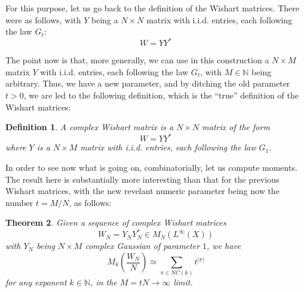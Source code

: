 \documentclass[12pt]{amsbook}
\newtheorem{theorem}{Theorem}[chapter]
\newtheorem{definition}[theorem]{Definition}
\begin{document}
\bigskip

For this purpose, let us go back to the definition of the Wishart matrices. There were as follows, with $Y$ being a $N\times N$ matrix with i.i.d. entries, each following the law $G_t$:
$$W=YY^*$$

The point now is that, more generally, we can use in this construction a $N\times M$ matrix $Y$ with i.i.d. entries, each following the law $G_t$, with $M\in\mathbb N$ being arbitrary. Thus, we have a new parameter, and by ditching the old parameter $t>0$, we are led to the following definition, which is the ``true'' definition of the Wishart matrices:

\begin{definition}
A complex Wishart matrix is a $N\times N$ matrix of the form
$$W=YY^*$$
where $Y$ is a $N\times M$ matrix with i.i.d. entries, each following the law $G_1$.
\end{definition}

In order to see now what is going on, combinatorially, let us compute moments. The result here is substantially more interesting than that for the previous Wishart matrices, with the new revelant numeric parameter being now the number $t=M/N$, as follows:

\begin{theorem}
Given a sequence of complex Wishart matrices
$$W_N=Y_NY_N^*\in M_N(L^\infty(X))$$
with $Y_N$ being $N\times M$ complex Gaussian of parameter $1$, we have
$$M_k\left(\frac{W_N}{N}\right)\simeq\sum_{\pi\in NC(k)}t^{|\pi|}$$
for any exponent $k\in\mathbb N$, in the $M=tN\to\infty$ limit.
\end{theorem}
\end{document}
